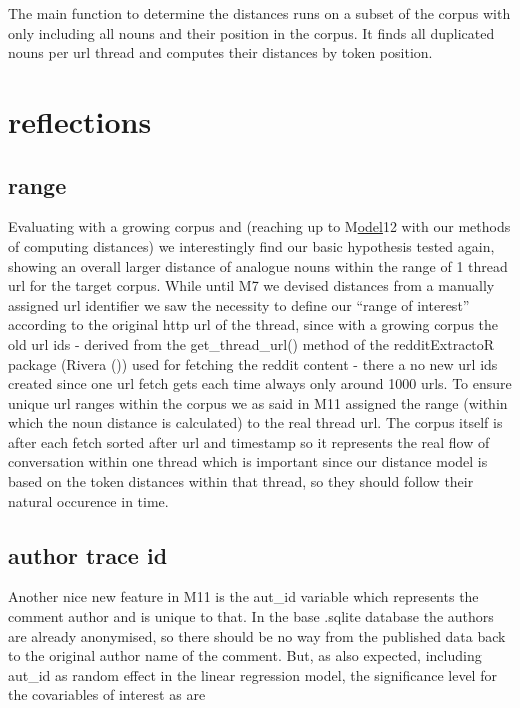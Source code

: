 \documentclass[
  12pt,
  oneside]{book}
\begin{document}
The main function to determine the distances runs on a subset of the corpus with only including all nouns and their position in the corpus. It finds all duplicated nouns per url thread and computes their distances by token position.

\section{reflections}\label{reflections}

\subsection{range}\label{range}

Evaluating with a growing corpus and (reaching up to M\href{}{odel}12 with our methods of computing distances) we interestingly find our basic hypothesis tested again, showing an overall larger distance of analogue nouns within the range of 1 thread url for the target corpus. While until M7 we devised distances from a manually assigned url identifier we saw the necessity to define our ``range of interest'' according to the original http url of the thread, since with a growing corpus the old url ids - derived from the get\_thread\_url() method of the redditExtractoR package (Rivera ()) used for fetching the reddit content - there a no new url ids created since one url fetch gets each time always only around 1000 urls. To ensure unique url ranges within the corpus we as said in M11 assigned the range (within which the noun distance is calculated) to the real thread url. The corpus itself is after each fetch sorted after url and timestamp so it represents the real flow of conversation within one thread which is important since our distance model is based on the token distances within that thread, so they should follow their natural occurence in time.

\subsection{author trace id}\label{author-trace-id}

Another nice new feature in M11 is the aut\_id variable which represents the comment author and is unique to that. In the base .sqlite database the authors are already anonymised, so there should be no way from the published data back to the original author name of the comment. But, as also expected, including aut\_id as random effect in the linear regression model, the significance level for the covariables of interest as are
\end{document}
